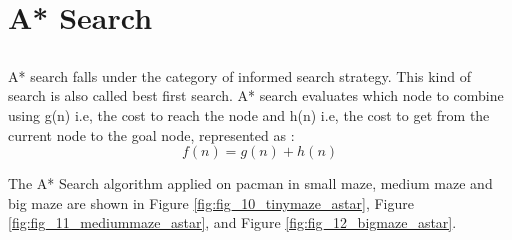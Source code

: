 \documentclass[
10pt, %
a4paper, %
oneside, %
headinclude,footinclude, %
BCOR5mm, %
]{scrartcl}
\begin{document}
\section{{\textbf{A* Search}}}
\subsection*{}
A* search falls under the category of informed search strategy. This kind of search is also called best first search. A* search evaluates which node to combine using g(n) i.e, the cost to reach the node and h(n) i.e, the cost to get from the current node to the goal node, represented as :$$f(n)=g(n)+h(n)$$

The A* Search algorithm applied on pacman in small maze, medium maze and big maze are shown in Figure \ref{fig:fig_10_tinymaze_astar}, Figure \ref{fig:fig_11_mediummaze_astar}, and Figure \ref{fig:fig_12_bigmaze_astar}.
\end{document}
